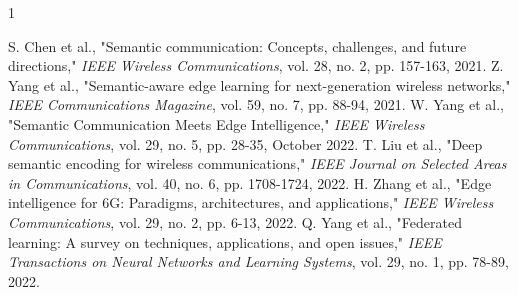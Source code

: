 \documentclass[conference]{IEEEtran}
\begin{document}
\begin{thebibliography}{1}

 S. Chen et al., "Semantic communication: Concepts, challenges, and future directions," \textit{IEEE Wireless Communications}, vol. 28, no. 2, pp. 157-163, 2021.
 Z. Yang et al., "Semantic-aware edge learning for next-generation wireless networks," \textit{IEEE Communications Magazine}, vol. 59, no. 7, pp. 88-94, 2021.
 W. Yang et al., "Semantic Communication Meets Edge Intelligence," \textit{IEEE Wireless Communications}, vol. 29, no. 5, pp. 28-35, October 2022.
 T. Liu et al., "Deep semantic encoding for wireless communications," \textit{IEEE Journal on Selected Areas in Communications}, vol. 40, no. 6, pp. 1708-1724, 2022.
 H. Zhang et al., "Edge intelligence for 6G: Paradigms, architectures, and applications," \textit{IEEE Wireless Communications}, vol. 29, no. 2, pp. 6-13, 2022.
 Q. Yang et al., "Federated learning: A survey on techniques, applications, and open issues," \textit{IEEE Transactions on Neural Networks and Learning Systems}, vol. 29, no. 1, pp. 78-89, 2022.
\end{thebibliography}
\end{document}

